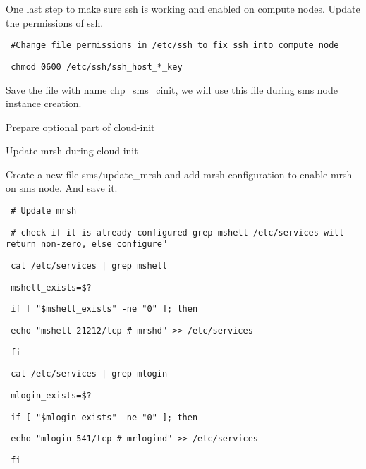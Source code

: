 \begin{section}
One last step to make sure ssh is working and enabled on compute nodes. Update the permissions of ssh.

\begin{bash}\texttt{\small{ \#Change file permissions in /etc/ssh to fix ssh into compute node}}\end{bash}
\begin{bash}\texttt{\small{ chmod 0600 /etc/ssh/ssh\_host\_*\_key}}\end{bash}

Save the file with name chp\_sms\_cinit, we will use this file during sms node instance creation.

Prepare optional part of cloud-init

Update mrsh during cloud-init 

Create a new file sms/update\_mrsh and add mrsh configuration to enable mrsh on sms node. And save it. 


\begin{bash}\texttt{\small{ \# Update mrsh}}\end{bash}
\begin{bash}\texttt{\small{ \# check if it is already configured grep mshell /etc/services will return non-zero, else configure"}}\end{bash}
\begin{bash}\texttt{\small{ cat /etc/services | grep mshell}}\end{bash}
\begin{bash}\texttt{\small{ mshell\_exists=\$?}}\end{bash}
\begin{bash}\texttt{\small{ if [ "\${mshell\_exists}" -ne "0" ]; then}}\end{bash}
\begin{bash}\texttt{\small{     echo "mshell          21212/tcp                  \# mrshd" >> /etc/services}}\end{bash}
\begin{bash}\texttt{\small{ fi}}\end{bash}
\begin{bash}\texttt{\small{ cat /etc/services | grep mlogin}}\end{bash}
\begin{bash}\texttt{\small{ mlogin\_exists=\$?}}\end{bash}
\begin{bash}\texttt{\small{ if [ "\${mlogin\_exists}" -ne "0" ]; then}}\end{bash}
\begin{bash}\texttt{\small{     echo "mlogin            541/tcp                  \# mrlogind" >> /etc/services}}\end{bash}
\begin{bash}\texttt{\small{ fi}}\end{bash}


\end{section}
